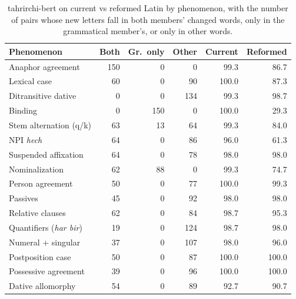 \begin{table}[t]
\centering\small
\setlength{\tabcolsep}{4pt}
\begin{tabular}{lrrrrr}
\toprule
Phenomenon & Both & Gr.\ only & Other & Current & Reformed \\
\midrule
Anaphor agreement & 150 & 0 & 0 & 99.3 & 86.7 \\
Lexical case & 60 & 0 & 90 & 100.0 & 87.3 \\
Ditransitive dative & 0 & 0 & 134 & 99.3 & 98.7 \\
Binding & 0 & 150 & 0 & 100.0 & 29.3 \\
Stem alternation (q/k) & 63 & 13 & 64 & 99.3 & 84.0 \\
NPI \textit{hech} & 64 & 0 & 86 & 96.0 & 61.3 \\
Suspended affixation & 64 & 0 & 78 & 98.0 & 98.0 \\
Nominalization & 62 & 88 & 0 & 99.3 & 74.7 \\
Person agreement & 50 & 0 & 77 & 100.0 & 99.3 \\
Passives & 45 & 0 & 92 & 98.0 & 98.0 \\
Relative clauses & 62 & 0 & 84 & 98.7 & 95.3 \\
Quantifiers (\textit{har bir}) & 19 & 0 & 124 & 98.7 & 98.0 \\
Numeral + singular & 37 & 0 & 107 & 98.0 & 96.0 \\
Postposition case & 50 & 0 & 87 & 100.0 & 100.0 \\
Possessive agreement & 39 & 0 & 96 & 100.0 & 100.0 \\
Dative allomorphy & 54 & 0 & 89 & 92.7 & 90.7 \\
\bottomrule
\end{tabular}
\caption{tahrirchi-bert on current vs reformed Latin by phenomenon, with the number of pairs whose new letters fall in both members' changed words, only in the grammatical member's, or only in other words.}
\label{tab:reformphen}
\end{table}
